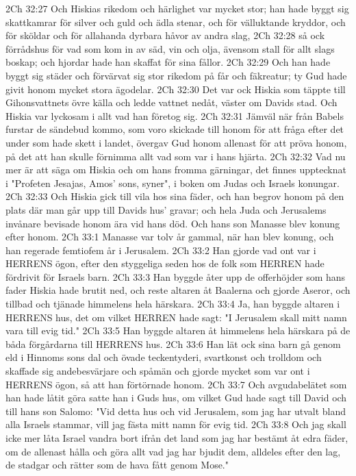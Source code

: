 2Ch 32:27  Och Hiskias rikedom och härlighet var mycket stor; han hade byggt sig skattkamrar för silver och guld och ädla stenar, och för välluktande kryddor, och för sköldar och för allahanda dyrbara håvor av andra slag,
2Ch 32:28  så ock förrådshus för vad som kom in av säd, vin och olja, ävensom stall för allt slags boskap; och hjordar hade han skaffat för sina fållor.
2Ch 32:29  Och han hade byggt sig städer och förvärvat sig stor rikedom på får och fäkreatur; ty Gud hade givit honom mycket stora ägodelar.
2Ch 32:30  Det var ock Hiskia som täppte till Gihonsvattnets övre källa och ledde vattnet nedåt, väster om Davids stad. Och Hiskia var lyckosam i allt vad han företog sig.
2Ch 32:31  Jämväl när från Babels furstar de sändebud kommo, som voro skickade till honom för att fråga efter det under som hade skett i landet, övergav Gud honom allenast för att pröva honom, på det att han skulle förnimma allt vad som var i hans hjärta.
2Ch 32:32  Vad nu mer är att säga om Hiskia och om hans fromma gärningar, det finnes upptecknat i "Profeten Jesajas, Amos' sons, syner", i boken om Judas och Israels konungar.
2Ch 32:33  Och Hiskia gick till vila hos sina fäder, och han begrov honom på den plats där man går upp till Davids hus' gravar; och hela Juda och Jerusalems invånare bevisade honom ära vid hans död. Och hans son Manasse blev konung efter honom.
2Ch 33:1  Manasse var tolv år gammal, när han blev konung, och han regerade femtiofem år i Jerusalem.
2Ch 33:2  Han gjorde vad ont var i HERRENS ögon, efter den styggeliga seden hos de folk som HERREN hade fördrivit för Israels barn.
2Ch 33:3  Han byggde åter upp de offerhöjder som hans fader Hiskia hade brutit ned, och reste altaren åt Baalerna och gjorde Aseror, och tillbad och tjänade himmelens hela härskara.
2Ch 33:4  Ja, han byggde altaren i HERRENS hus, det om vilket HERREN hade sagt: "I Jerusalem skall mitt namn vara till evig tid."
2Ch 33:5  Han byggde altaren åt himmelens hela härskara på de båda förgårdarna till HERRENS hus.
2Ch 33:6  Han lät ock sina barn gå genom eld i Hinnoms sons dal och övade teckentyderi, svartkonst och trolldom och skaffade sig andebesvärjare och spåmän och gjorde mycket som var ont i HERRENS ögon, så att han förtörnade honom.
2Ch 33:7  Och avgudabelätet som han hade låtit göra satte han i Guds hus, om vilket Gud hade sagt till David och till hans son Salomo: "Vid detta hus och vid Jerusalem, som jag har utvalt bland alla Israels stammar, vill jag fästa mitt namn för evig tid.
2Ch 33:8  Och jag skall icke mer låta Israel vandra bort ifrån det land som jag har bestämt åt edra fäder, om de allenast hålla och göra allt vad jag har bjudit dem, alldeles efter den lag, de stadgar och rätter som de hava fått genom Mose."
